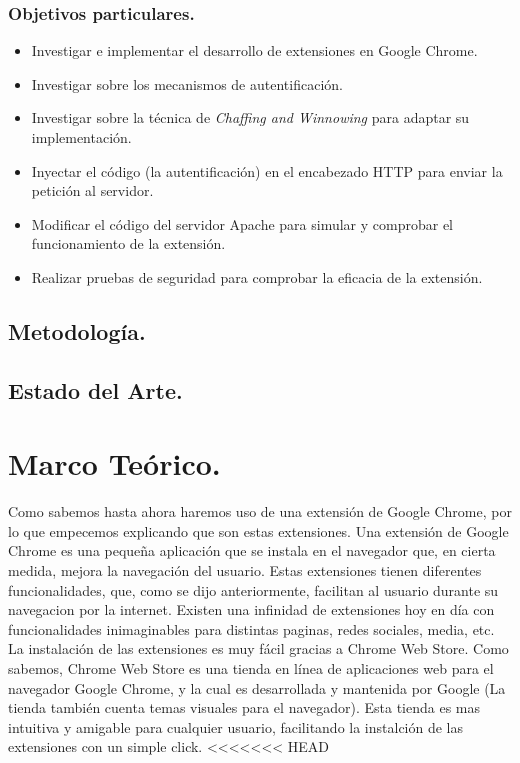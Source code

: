 \documentclass[12pt, a4paper, titlepage]{article}
\begin{document}
			\subsubsection{Objetivos particulares.}
			\begin{itemize}
				\item Investigar e implementar el desarrollo de extensiones en Google Chrome.
				\item Investigar sobre los mecanismos de autentificación.
				\item Investigar sobre la técnica de \textit{Chaffing and Winnowing} para adaptar su implementación.
				\item Inyectar el código (la autentificación) en el encabezado HTTP para enviar la petición al servidor. 
				\item Modificar el código del servidor Apache para simular y comprobar el funcionamiento de la extensión.
				\item Realizar pruebas de seguridad para comprobar la eficacia de la extensión. 
			\end{itemize}
		\subsection{Metodología.}
		\subsection{Estado del Arte.}
	\newpage
	\section{\textcolor{azulescom}{Marco Teórico.}}
		Como sabemos hasta ahora haremos uso de una extensión de Google Chrome, por lo que empecemos explicando que son estas extensiones. Una extensión de Google Chrome es una pequeña aplicación que se instala en el navegador que, en cierta medida, mejora la navegación del usuario. Estas extensiones tienen diferentes funcionalidades, que, como se dijo anteriormente, facilitan al usuario durante su navegacion por la internet. Existen una infinidad de extensiones hoy en día con funcionalidades inimaginables para distintas paginas, redes sociales, media, etc. La instalación de las extensiones es muy fácil gracias a Chrome Web Store. Como sabemos, Chrome Web Store es una tienda en línea de aplicaciones web para el navegador Google Chrome, y la cual es desarrollada y mantenida por Google (La tienda también cuenta temas visuales para el navegador). Esta tienda es mas intuitiva y amigable para cualquier usuario, facilitando la instalción de las extensiones con un simple click.
<<<<<<< HEAD
		
\end{document}
